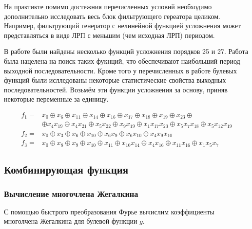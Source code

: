 \documentclass[a4paper,12pt]{article}
\theoremstyle{definition}
\begin{document}
	
	На практикте помимо достежния перечисленных условий необходимо дополнительно исследовать весь блок фильтрующего гереатора целиком.
	Например, фильтрующий генератор с нелинейной функцией усложнения может представляться в виде ЛРП с меньшим (чем исходная ЛРП) периодом.
	
	В работе \textcite{rachwalik2012generation} были найдены несколько функций усложнения порядков 25 и 27. Работа была нацелена на поиск таких фукнций, что обеспечивают наибольший период выходной последовательности. Кроме того у перечисленных в работе булевых функций были ислледованы некоторые статистические свойства выходных последовательностей. Возьмём эти функции усложнения за основу, приняв некоторые переменные за единицу.
	
	\begin{align*}
		f_1 =& x_0 \oplus x_6 \oplus x_{11} \oplus x_{14} \oplus x_{16} \oplus x_{17} \oplus x_{18} \oplus x_{19} \oplus x_{23} \oplus\\
			 &\oplus x_{4} x_{19} \oplus x_{4} x_{21} \oplus x_5 x_{22} \oplus x_9 x_{19} \oplus x_1 x_{17} x_23 \oplus x_5 x_7 x_{18} \oplus x_5 x_{12} x_{19} \\[2ex]
		f_2 =& x_0 \oplus x_3 \oplus x_6 \oplus x_{10} \oplus x_6 x_9 \oplus x_6 x_{10} \oplus x_4 x_9 x_{10} \\[2ex]
		f_3 =& x_0 \oplus x_8 \oplus x_9 \oplus x_{10} \oplus x_{11} \oplus x_{10} x_{14} \oplus x_4 x_{16}\oplus x_{11} x_{16} \oplus x_1 x_5 x_7 
	\end{align*}
	
	\subsection{Комбинирующая функция}
	
	\subsubsection{Вычисление многочлена Жегалкина}
	
	С помощью быстрого преобразования Фурье вычислим коэффициенты многолчена Жегалкина для булевой функции $g$.
	
\end{document}

